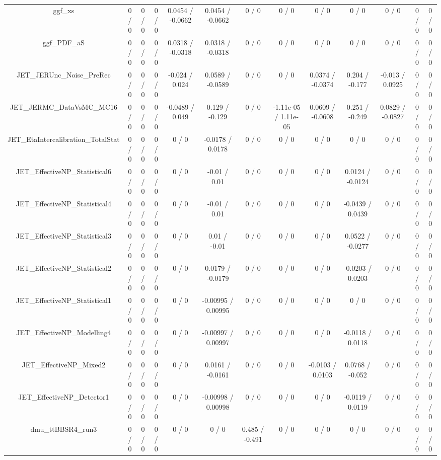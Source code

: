 \documentclass[10pt]{article}
\begin{document}
\begin{table}[htbp]
\begin{center}
\begin{tabular}{|c|c|c|c|c|c|c|c|c|c|c|c|c|}
  ggf_xs & 0 / 0 & 0 / 0 & 0 / 0 & 0.0454 / -0.0662 & 0.0454 / -0.0662 & 0 / 0 & 0 / 0 & 0 / 0 & 0 / 0 & 0 / 0 & 0 / 0 & 0 / 0 \\ 
  ggf_PDF_aS & 0 / 0 & 0 / 0 & 0 / 0 & 0.0318 / -0.0318 & 0.0318 / -0.0318 & 0 / 0 & 0 / 0 & 0 / 0 & 0 / 0 & 0 / 0 & 0 / 0 & 0 / 0 \\ 
  JET_JERUnc_Noise_PreRec & 0 / 0 & 0 / 0 & 0 / 0 & -0.024 / 0.024 & 0.0589 / -0.0589 & 0 / 0 & 0 / 0 & 0.0374 / -0.0374 & 0.204 / -0.177 & -0.013 / 0.0925 & 0 / 0 & 0 / 0 \\ 
  JET_JERMC_DataVsMC_MC16 & 0 / 0 & 0 / 0 & 0 / 0 & -0.0489 / 0.049 & 0.129 / -0.129 & 0 / 0 & -1.11e-05 / 1.11e-05 & 0.0609 / -0.0608 & 0.251 / -0.249 & 0.0829 / -0.0827 & 0 / 0 & 0 / 0 \\ 
  JET_EtaIntercalibration_TotalStat & 0 / 0 & 0 / 0 & 0 / 0 & 0 / 0 & -0.0178 / 0.0178 & 0 / 0 & 0 / 0 & 0 / 0 & 0 / 0 & 0 / 0 & 0 / 0 & 0 / 0 \\ 
  JET_EffectiveNP_Statistical6 & 0 / 0 & 0 / 0 & 0 / 0 & 0 / 0 & -0.01 / 0.01 & 0 / 0 & 0 / 0 & 0 / 0 & 0.0124 / -0.0124 & 0 / 0 & 0 / 0 & 0 / 0 \\ 
  JET_EffectiveNP_Statistical4 & 0 / 0 & 0 / 0 & 0 / 0 & 0 / 0 & -0.01 / 0.01 & 0 / 0 & 0 / 0 & 0 / 0 & -0.0439 / 0.0439 & 0 / 0 & 0 / 0 & 0 / 0 \\ 
  JET_EffectiveNP_Statistical3 & 0 / 0 & 0 / 0 & 0 / 0 & 0 / 0 & 0.01 / -0.01 & 0 / 0 & 0 / 0 & 0 / 0 & 0.0522 / -0.0277 & 0 / 0 & 0 / 0 & 0 / 0 \\ 
  JET_EffectiveNP_Statistical2 & 0 / 0 & 0 / 0 & 0 / 0 & 0 / 0 & 0.0179 / -0.0179 & 0 / 0 & 0 / 0 & 0 / 0 & -0.0203 / 0.0203 & 0 / 0 & 0 / 0 & 0 / 0 \\ 
  JET_EffectiveNP_Statistical1 & 0 / 0 & 0 / 0 & 0 / 0 & 0 / 0 & -0.00995 / 0.00995 & 0 / 0 & 0 / 0 & 0 / 0 & 0 / 0 & 0 / 0 & 0 / 0 & 0 / 0 \\ 
  JET_EffectiveNP_Modelling4 & 0 / 0 & 0 / 0 & 0 / 0 & 0 / 0 & -0.00997 / 0.00997 & 0 / 0 & 0 / 0 & 0 / 0 & -0.0118 / 0.0118 & 0 / 0 & 0 / 0 & 0 / 0 \\ 
  JET_EffectiveNP_Mixed2 & 0 / 0 & 0 / 0 & 0 / 0 & 0 / 0 & 0.0161 / -0.0161 & 0 / 0 & 0 / 0 & -0.0103 / 0.0103 & 0.0768 / -0.052 & 0 / 0 & 0 / 0 & 0 / 0 \\ 
  JET_EffectiveNP_Detector1 & 0 / 0 & 0 / 0 & 0 / 0 & 0 / 0 & -0.00998 / 0.00998 & 0 / 0 & 0 / 0 & 0 / 0 & -0.0119 / 0.0119 & 0 / 0 & 0 / 0 & 0 / 0 \\ 
  dmu_ttBBSR4_run3 & 0 / 0 & 0 / 0 & 0 / 0 & 0 / 0 & 0 / 0 & 0.485 / -0.491 & 0 / 0 & 0 / 0 & 0 / 0 & 0 / 0 & 0 / 0 & 0 / 0 \\ 

\end{tabular}
\end{center}
\end{table}
\end{document}
